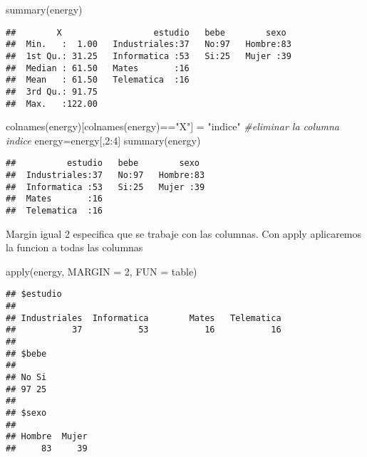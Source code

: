 \documentclass[
]{article}
\newenvironment{Shaded}{\begin{snugshade}}{\end{snugshade}}
\newcommand{\AttributeTok}[1]{\textcolor[rgb]{0.77,0.63,0.00}{#1}}
\newcommand{\CommentTok}[1]{\textcolor[rgb]{0.56,0.35,0.01}{\textit{#1}}}
\newcommand{\DecValTok}[1]{\textcolor[rgb]{0.00,0.00,0.81}{#1}}
\newcommand{\FunctionTok}[1]{\textcolor[rgb]{0.00,0.00,0.00}{#1}}
\newcommand{\NormalTok}[1]{#1}
\newcommand{\OtherTok}[1]{\textcolor[rgb]{0.56,0.35,0.01}{#1}}
\newcommand{\SpecialCharTok}[1]{\textcolor[rgb]{0.00,0.00,0.00}{#1}}
\newcommand{\StringTok}[1]{\textcolor[rgb]{0.31,0.60,0.02}{#1}}
\begin{document}
\begin{Shaded}
\begin{Highlighting}[]
\FunctionTok{summary}\NormalTok{(energy)}
\end{Highlighting}
\end{Shaded}

\begin{verbatim}
##        X                  estudio   bebe        sexo   
##  Min.   :  1.00   Industriales:37   No:97   Hombre:83  
##  1st Qu.: 31.25   Informatica :53   Si:25   Mujer :39  
##  Median : 61.50   Mates       :16                      
##  Mean   : 61.50   Telematica  :16                      
##  3rd Qu.: 91.75                                        
##  Max.   :122.00
\end{verbatim}

\begin{Shaded}
\begin{Highlighting}[]
\FunctionTok{colnames}\NormalTok{(energy)[}\FunctionTok{colnames}\NormalTok{(energy)}\SpecialCharTok{==}\StringTok{"X"}\NormalTok{] }\OtherTok{=} \StringTok{"indice"}
\CommentTok{\#eliminar la columna indice}
\NormalTok{energy}\OtherTok{=}\NormalTok{energy[,}\DecValTok{2}\SpecialCharTok{:}\DecValTok{4}\NormalTok{]}
\FunctionTok{summary}\NormalTok{(energy)}
\end{Highlighting}
\end{Shaded}

\begin{verbatim}
##          estudio   bebe        sexo   
##  Industriales:37   No:97   Hombre:83  
##  Informatica :53   Si:25   Mujer :39  
##  Mates       :16                      
##  Telematica  :16
\end{verbatim}

Margin igual 2 especifica que se trabaje con las columnas. Con apply
aplicaremos la funcion a todas las columnas

\begin{Shaded}
\begin{Highlighting}[]
\FunctionTok{apply}\NormalTok{(energy, }\AttributeTok{MARGIN =} \DecValTok{2}\NormalTok{, }\AttributeTok{FUN =}\NormalTok{ table)}
\end{Highlighting}
\end{Shaded}

\begin{verbatim}
## $estudio
## 
## Industriales  Informatica        Mates   Telematica 
##           37           53           16           16 
## 
## $bebe
## 
## No Si 
## 97 25 
## 
## $sexo
## 
## Hombre  Mujer 
##     83     39
\end{verbatim}
\end{document}
